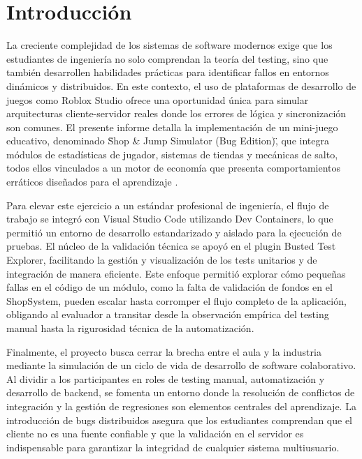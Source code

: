 
%




\section{Introducción}
\label{intro}
La creciente complejidad de los sistemas de software modernos exige que los estudiantes de ingeniería no solo comprendan la teoría del testing, sino que también desarrollen habilidades prácticas para identificar fallos en entornos dinámicos y distribuidos. En este contexto, el uso de plataformas de desarrollo de juegos como Roblox Studio ofrece una oportunidad única para simular arquitecturas cliente-servidor reales donde los errores de lógica y sincronización son comunes. El presente informe detalla la implementación de un mini-juego educativo, denominado \"Shop \& Jump Simulator (Bug Edition)\", que integra módulos de estadísticas de jugador, sistemas de tiendas y mecánicas de salto, todos ellos vinculados a un motor de economía que presenta comportamientos erráticos diseñados para el aprendizaje \cite{ucsm}.

Para elevar este ejercicio a un estándar profesional de ingeniería, el flujo de trabajo se integró con Visual Studio Code utilizando Dev Containers, lo que permitió un entorno de desarrollo estandarizado y aislado para la ejecución de pruebas. El núcleo de la validación técnica se apoyó en el plugin Busted Test Explorer, facilitando la gestión y visualización de los tests unitarios y de integración de manera eficiente. Este enfoque permitió explorar cómo pequeñas fallas en el código de un módulo, como la falta de validación de fondos en el ShopSystem, pueden escalar hasta corromper el flujo completo de la aplicación, obligando al evaluador a transitar desde la observación empírica del testing manual hasta la rigurosidad técnica de la automatización.

Finalmente, el proyecto busca cerrar la brecha entre el aula y la industria mediante la simulación de un ciclo de vida de desarrollo de software colaborativo. Al dividir a los participantes en roles de testing manual, automatización y desarrollo de backend, se fomenta un entorno donde la resolución de conflictos de integración y la gestión de regresiones son elementos centrales del aprendizaje. La introducción de bugs distribuidos asegura que los estudiantes comprendan que el cliente no es una fuente confiable y que la validación en el servidor es indispensable para garantizar la integridad de cualquier sistema multiusuario.


